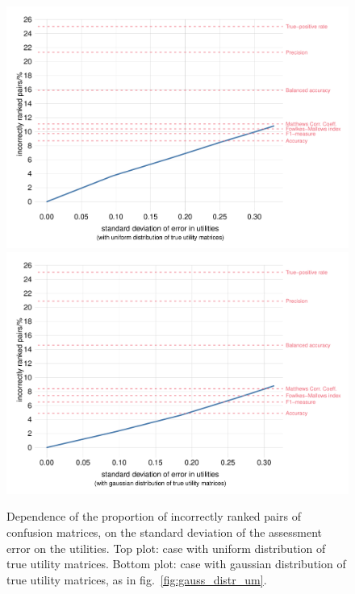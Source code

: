 \documentclass[\ifafour a4paper,12pt,\else a5paper,10pt,\fi%
onecolumn,oneside,article,%
british%
]{memoir}
\theoremstyle{remark}
\theoremstyle{innote}
\renewcommand*{\|}[1][]{\nonscript\:#1\vert\nonscript\:\mathopen{}}
\newcommand*{\fig}{fig.}%
\begin{document}
\begin{figure}[p]
  \centering
    \includegraphics[width=0.99\linewidth]{increase_error2_unif.pdf}\\\hfill
    \includegraphics[width=0.99\linewidth]{increase_error2_norm.pdf}\\\hfill
  \caption{Dependence of the proportion of incorrectly ranked pairs of confusion matrices, on the standard deviation of the assessment error on the utilities. Top plot: case with uniform distribution of true utility matrices. Bottom plot: case with gaussian distribution of true utility matrices, as in \fig~\ref{fig:gauss_distr_um}.}
  \label{fig:percentage_vs_error}
\end{figure}
\end{document}
